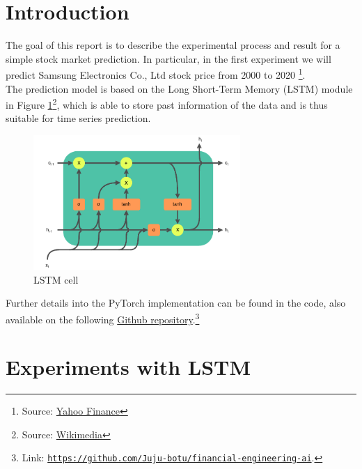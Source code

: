 \documentclass[12pt]{article}
\begin{document}


\section{Introduction}

The goal of this report is to describe the experimental process and result for a simple stock market prediction. In particular, in the first experiment we will predict Samsung Electronics Co., Ltd stock price from 2000 to 2020 \footnote{Source: \href{https://finance.yahoo.com/quote/005930.KS/history/}{Yahoo Finance}}.\\
The prediction model is based on the Long Short-Term Memory (LSTM) \cite{hochreiter1997long} module in Figure \ref{fig:LSTM}\footnote{Source: \href{https://commons.wikimedia.org/wiki/File:LSTM_cell.svg}{Wikimedia}}, which is able to store past information of the data and is thus suitable for time series prediction.

\begin{figure}[h!]
    \centering
    \includegraphics[width=0.7\textwidth]{images/LSTM_cell.pdf}
    \caption{LSTM cell}
    \label{fig:LSTM}
\end{figure}

Further details into the PyTorch \cite{pytorch} implementation can be found in the code, also available on the following \href{https://github.com/Juju-botu/financial-engineering-ai}{Github repository}.\footnote{Link: \href{https://github.com/Juju-botu/financial-engineering-ai}{\tt{https://github.com/Juju-botu/financial-engineering-ai}}.}

\section{Experiments with LSTM}
\end{document}
